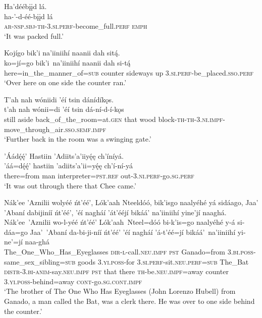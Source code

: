 \ea\label{ex:text1-31-2}
Ha’déébįįd lá.\\
\gll ha-’-d-éé-bįįd	lá\\
     \textsc{ar}-\textsc{nsp}.\textsc{sbj}-\textsc{th}-3.\textsc{si}.\textsc{perf}-become\_full.\textsc{perf}	\textsc{emph}\\
\glt `It was packed full.'
\z

\ea\label{ex:text1-31-3}
Kojígo bik’i na’iiniihí naanii dah sitą́.\\
\gll ko=jí=go	bik’i~{na’iiniihí}	naanii	dah	si-tą́\\
     here=in\_the\_manner\_of=\textsc{sub}	counter	sideways	up	3.\textsc{si}.\textsc{perf}-be\_placed.\textsc{sso}.\textsc{perf}\\
\glt `Over here on one side the counter ran.'
\z

\ea\label{ex:text1-31-4}
T’ah nah wóniidi ’éí tsin dánídíkǫs.\\
\gll t’ah	nah	wónii=di	’éí	tsin	dá-ní-d-í-kǫs\\
     still	aside	back\_of\_the\_room=at.\textsc{gen}	that	wood	block-\textsc{th}-\textsc{th}-3.\textsc{ni}.\textsc{impf}-move\_through\_air.\textsc{sso}.\textsc{semf}.\textsc{impf}\\
\glt `Further back in the room was a swinging gate.'
\z

\ea\label{ex:text1-31-5}
’Áádę́ę́’ Hastiin ’Adiits’a’iiyę́ę ch’íníyá.\\
\gll ’áá=dę́ę́’	hastiin	’adiits’a’ii=yę́ę	ch’í-ní-yá\\
     there=from	man	interpreter=\textsc{pst}.\textsc{ref}	out-3.\textsc{ni}.\textsc{perf}-go.\textsc{sg}.\textsc{perf}\\
\glt `It was out through there that Chee came.'
\z

\ea\label{ex:text1-31-6}
Nák’ee ’Aznilii wolyéé ńt’éé’, Lók’aah Nteeldóó, bik’isgo naalyéhé yá sidáago, Jaa’ ’Abaní dabijiníí ńt’éé’, ’éí nagháí ’át’ééjí bikáá’ na’iiniihí yine’jí naaghá.\\
\gll Nák’ee~{’Aznilii}	wo-l-yéé	ńt’éé’	Lók’aah~{Nteel=dóó}	bi-k’is=go	naalyéhé	y-á	si-dáa=go	Jaa’~{’Abaní}	da-bi-ji-níí	ńt’éé’	’éí	nagháí	’á-t’éé=jí	bikáá’~{na’iiniihí}	yi-ne’=jí	naa-ghá\\
     The\_One\_Who\_Has\_Eyeglasses	\textsc{dir}-\textsc{l}-call.\textsc{neu}.\textsc{impf}	\textsc{pst}	Ganado=from	3.\textsc{bi}.\textsc{poss}-same\_sex\_sibling=\textsc{sub}	goods	3.\textsc{yi}.\textsc{poss}-for	3.\textsc{si}.\textsc{perf}-sit.\textsc{neu}.\textsc{perf}=\textsc{sub}	The\_Bat	\textsc{distr}-3.\textsc{bi}-\textsc{anim}-say.\textsc{neu}.\textsc{impf}	\textsc{pst}	that	there	\textsc{th}-be.\textsc{neu}.\textsc{impf}=away	counter	3.\textsc{yi}.\textsc{poss}-behind=away	\textsc{cont}-go.\textsc{sg}.\textsc{cont}.\textsc{impf}\\
\glt `The brother of The One Who Has Eyeglasses (John Lorenzo Hubell) from Ganado, a man called the Bat, was a clerk there. He was over to one side behind the counter.'
\z

